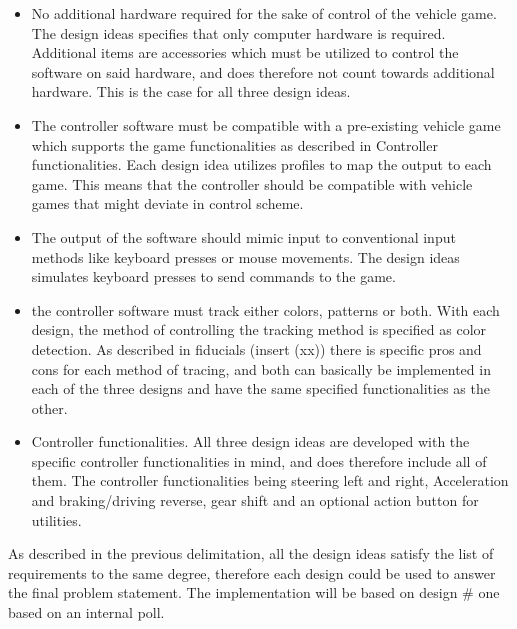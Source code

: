 \begin{itemize}
\item No additional hardware required for the sake of control of the vehicle game.\newline
The design ideas specifies that only computer hardware is required. Additional items are accessories which must be utilized to control the software on said hardware, and does therefore not count towards additional hardware. This is the case for all three design ideas.

\item The controller software must be compatible with a pre-existing vehicle game which supports
the game functionalities as described in Controller functionalities.\newline
Each design idea utilizes profiles to map the output to each game. This means that the controller should be compatible with vehicle games that might deviate in control scheme.

\item The output of the software should mimic input to conventional input methods like keyboard
presses or mouse movements.\newline
The design ideas simulates keyboard presses to send commands to the game. 

\item the controller software must track either colors, patterns or both.\newline
With each design, the method of controlling the tracking method is specified as color detection. As described in fiducials (insert (xx)) there is specific pros and cons for each method of tracing, and both can basically be implemented in each of the three designs and have the same specified functionalities as the other.

\item Controller functionalities.\newline
All three design ideas are developed with the specific controller functionalities in mind, and does therefore include all of them. The controller functionalities being steering left and right, Acceleration and braking/driving reverse, gear shift and an optional action button for utilities.

\end{itemize}

As described in the previous delimitation, all the design ideas satisfy the list of requirements to the same degree, therefore each design could be used to answer the final problem statement. The implementation will be based on design \# one based on an internal poll.
